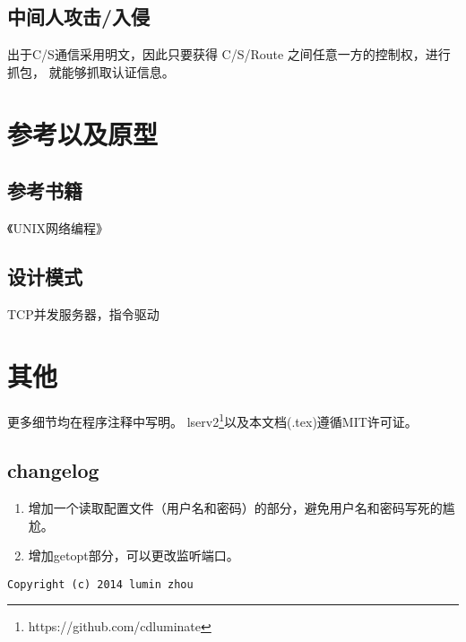 \documentclass[a4paper,12pt]{article}
\begin{document}
\begin{CJK}{UTF8}{gbsn}
	\subsection{中间人攻击/入侵}
		出于C/S通信采用明文，因此只要获得 C/S/Route 之间任意一方的控制权，进行抓包，
		就能够抓取认证信息。

\section{参考以及原型}
	\subsection{参考书籍}
		《UNIX网络编程》
	\subsection{设计模式}
		TCP并发服务器，指令驱动

\section{其他}
	更多细节均在程序注释中写明。
	lserv2\footnote{https://github.com/cdluminate}以及本文档(.tex)遵循MIT许可证。
	\subsection{changelog}
		\begin{enumerate}
		\item 增加一个读取配置文件（用户名和密码）的部分，避免用户名和密码写死的尴尬。
		\item 增加getopt部分，可以更改监听端口。
		\end{enumerate}

	\begin{verbatim}
Copyright (c) 2014 lumin zhou
	\end{verbatim} 


\end{CJK}
\end{document}
